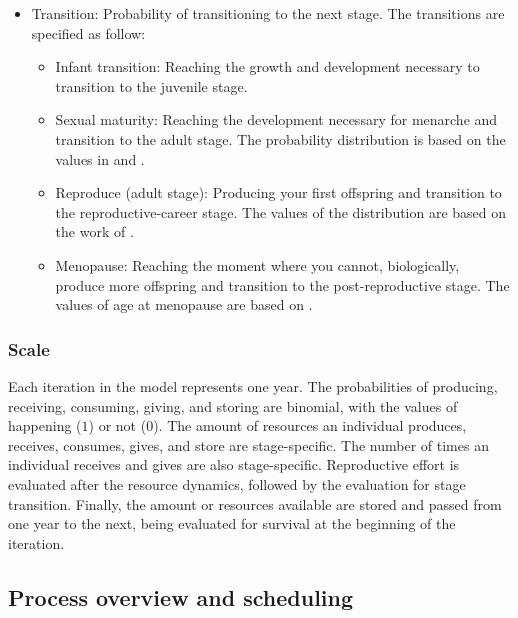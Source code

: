 \documentclass{article}
\begin{document}
\begin{itemize}
    \item Transition: Probability of transitioning to the next stage. The transitions are specified as follow:
    \begin{itemize}
        \item Infant transition: Reaching the growth and development necessary to transition to the juvenile stage.
        \item Sexual maturity: Reaching the development necessary for menarche and transition to the adult stage. The probability distribution is based on the values in \cite{mulder1989menarche} and \cite{kramer2010teen}.
        \item Reproduce (adult stage): Producing your first offspring and transition to the reproductive-career stage. The values of the distribution are based on the work of \cite{wood2017dynamics}.
        \item Menopause: Reaching the moment where you cannot, biologically, produce more offspring and transition to the post-reproductive stage. The values of age at menopause are based on \cite{laisk2019demographic}.
    \end{itemize}
\end{itemize}

\subsubsection{Scale}

Each iteration in the model represents one year. The probabilities  of producing, receiving, consuming, giving, and storing are binomial, with the values of happening ($1$) or not ($0$). The amount of resources an individual produces, receives, consumes, gives, and store are stage-specific. The number of times an individual receives and gives are also stage-specific. Reproductive effort is evaluated after the resource dynamics, followed by the evaluation for stage transition. Finally, the amount or resources available are stored and passed from one year to the next, being evaluated for survival at the beginning of the iteration.

\subsection{Process overview and scheduling}
\end{document}

